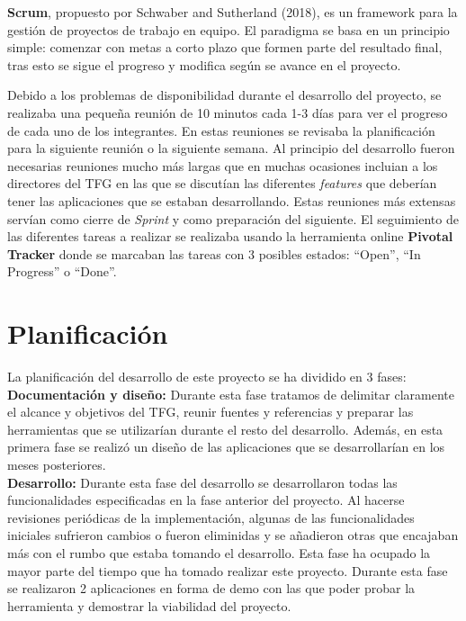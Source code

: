 \textbf{Scrum}, propuesto por Schwaber and Sutherland (2018), es un framework para la gesti\'on de proyectos de trabajo en equipo. El paradigma se basa en un principio simple: comenzar con metas a corto plazo que formen parte del resultado final, tras esto se sigue el progreso y modifica seg\'un se avance en el proyecto.

Debido a los problemas de disponibilidad durante el desarrollo del proyecto, se realizaba una peque\~na reuni\'on de 10 minutos cada 1-3 d\'ias para ver el progreso de cada uno de los integrantes. En estas reuniones se revisaba la planificaci\'on para la siguiente reuni\'on o la siguiente semana. Al principio del desarrollo fueron necesarias reuniones mucho m\'as largas que en muchas ocasiones incluian a los directores del TFG en las que se discut\'ian las diferentes \textit{features} que deber\'ian tener las aplicaciones que se estaban desarrollando. Estas reuniones m\'as extensas serv\'ian como cierre de \textit{Sprint} y como preparaci\'on del siguiente. El seguimiento de las diferentes tareas a realizar se realizaba usando la herramienta online \textbf{Pivotal Tracker} donde se marcaban las tareas con 3 posibles estados: ``Open'', ``In Progress'' o ``Done''.


\section{Planificaci\'on}

La planificaci\'on del desarrollo de este proyecto se ha dividido en 3 fases:\\


\textbf{Documentaci\'on y dise\~no:} Durante esta fase tratamos de delimitar claramente el alcance y objetivos del TFG, reunir fuentes y referencias y preparar las herramientas que se utilizar\'ian durante el resto del desarrollo. Adem\'as, en esta primera fase se realiz\'o un dise\~no de las aplicaciones que se desarrollar\'ian en los meses posteriores.\\

\textbf{Desarrollo:} Durante esta fase del desarrollo se desarrollaron todas las funcionalidades especificadas en la fase anterior del proyecto. Al hacerse revisiones peri\'odicas de la implementaci\'on, algunas de las funcionalidades iniciales sufrieron cambios o fueron eliminidas y se a\~nadieron otras que encajaban m\'as con el rumbo que estaba tomando el desarrollo. 
Esta fase ha ocupado la mayor parte del tiempo que ha tomado realizar este proyecto. Durante esta fase se realizaron 2 aplicaciones en forma de demo con las que poder probar la herramienta y demostrar la viabilidad del proyecto.\\

